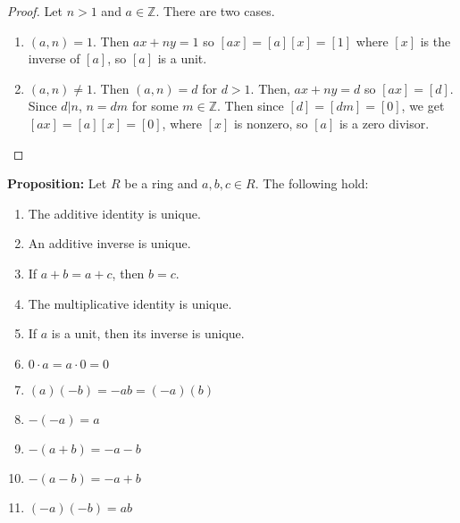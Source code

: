 \documentclass [12pt] {article}
\newcommand{\Z}{\mathbb{Z}}
\renewcommand{\it}[1]{\textit{{#1}}}
\renewcommand{\bf}[1]{\textbf{{#1}}}
\begin{document}
\begin{proof}
    Let $n > 1$ and $a \in \Z$. There are two cases.
    \begin{enumerate}[label=\it{Case \roman*}, leftmargin=*]
        \item $(a, n) = 1$. Then $ax + ny = 1$ so $[ax] = [a][x] = [1]$ where $[x]$ is the inverse
            of $[a]$, so $[a]$ is a unit.
        \item $(a, n) \neq 1$. Then $(a, n) = d$ for $d > 1$. Then, $ax + ny = d$ so
            $[ax] = [d]$. Since $d | n$, $n = dm$ for some $m \in \Z$. Then since $[d] = [dm] = [0]$, 
            we get $[ax] = [a][x] = [0]$, where $[x]$ is nonzero, so $[a]$ is a zero divisor.
    \end{enumerate}
\end{proof}

\newpage
\bf{Proposition:} Let $R$ be a ring and $a, b, c \in R$. The following hold:
\begin{enumerate}[label=(\arabic*)]
    \item The additive identity is unique.
    \item An additive inverse is unique.
    \item If $a + b = a + c$, then $b = c$.
    \item The multiplicative identity is unique.
    \item If $a$ is a unit, then its inverse is unique.
    \item $0 \cdot a = a \cdot 0 = 0$
    \item $(a)(-b) = -ab = (-a)(b)$
    \item $-(-a) = a$
    \item $-(a + b) = -a - b$
    \item $-(a - b) = -a + b$
    \item $(-a)(-b) = ab$
\end{enumerate}
\end{document}
